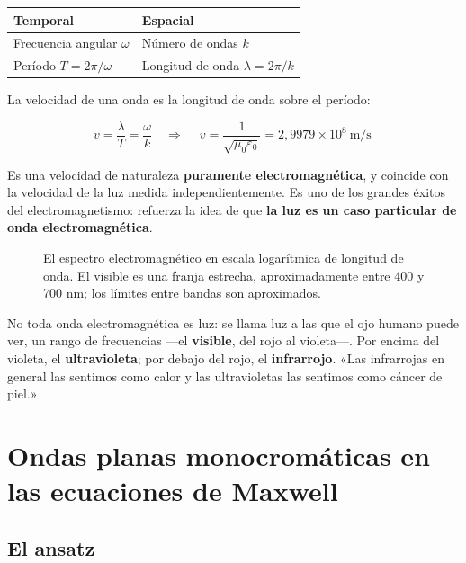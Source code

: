 \documentclass[12pt,a4paper]{article}
\begin{document}
\begin{center}
\renewcommand{\arraystretch}{1.35}
\small
\begin{tabularx}{\textwidth}{>{\raggedright\arraybackslash}X>{\raggedright\arraybackslash}X}
\toprule
\textbf{Temporal} & \textbf{Espacial} \\
\midrule
Frecuencia angular $\omega$ & Número de ondas $k$ \\
Período $T = 2\pi/\omega$ & Longitud de onda $\lambda = 2\pi/k$ \\
\bottomrule
\end{tabularx}
\end{center}

La velocidad de una onda es la longitud de onda sobre el período:

\[
v = \frac{\lambda}{T} = \frac{\omega}{k}
\quad\Longrightarrow\quad
\boxed{\ v = \frac{1}{\sqrt{\mu_0\varepsilon_0}} = 2{,}9979\times10^{8}\ \text{m/s}\ }
\]

Es una velocidad de naturaleza \textbf{puramente electromagnética}, y coincide con
la velocidad de la luz medida independientemente. Es uno de los grandes éxitos
del electromagnetismo: refuerza la idea de que \textbf{la luz es un caso particular
de onda electromagnética}.

\begin{figure}[H]
  \centering
  
  \caption{El espectro electromagnético en escala logarítmica de longitud de onda. El visible es una franja estrecha, aproximadamente entre 400 y 700 nm; los límites entre bandas son aproximados.}
\end{figure}

No toda onda electromagnética es luz: se llama luz a las que el ojo humano
puede ver, un rango de frecuencias ---el \textbf{visible}, del rojo al violeta---. Por
encima del violeta, el \textbf{ultravioleta}; por debajo del rojo, el
\textbf{infrarrojo}. «Las infrarrojas en general las sentimos como calor y las
ultravioletas las sentimos como cáncer de piel.»

\section{Ondas planas monocromáticas en las ecuaciones de Maxwell}

\subsection{El ansatz}
\end{document}
